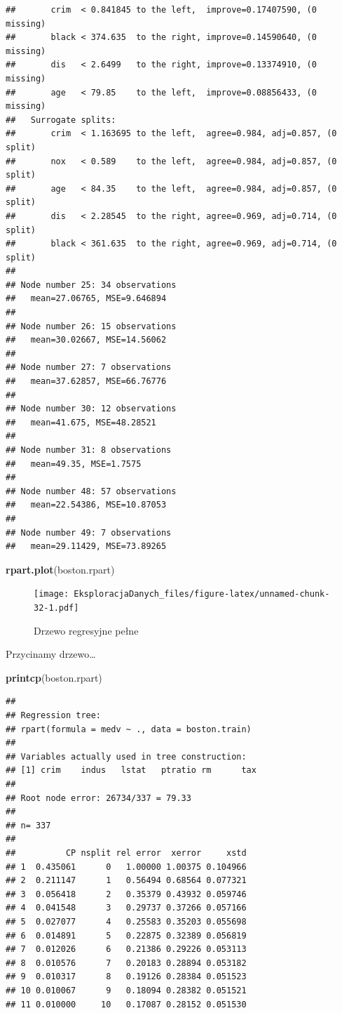 \documentclass[]{book}
\newenvironment{Shaded}{\begin{snugshade}}{\end{snugshade}}
\newcommand{\KeywordTok}[1]{\textcolor[rgb]{0.13,0.29,0.53}{\textbf{#1}}}
\newcommand{\NormalTok}[1]{#1}
\theoremstyle{plain}
\theoremstyle{definition}
\begin{document}
\begin{verbatim}
##       crim  < 0.841845 to the left,  improve=0.17407590, (0 missing)
##       black < 374.635  to the right, improve=0.14590640, (0 missing)
##       dis   < 2.6499   to the right, improve=0.13374910, (0 missing)
##       age   < 79.85    to the left,  improve=0.08856433, (0 missing)
##   Surrogate splits:
##       crim  < 1.163695 to the left,  agree=0.984, adj=0.857, (0 split)
##       nox   < 0.589    to the left,  agree=0.984, adj=0.857, (0 split)
##       age   < 84.35    to the left,  agree=0.984, adj=0.857, (0 split)
##       dis   < 2.28545  to the right, agree=0.969, adj=0.714, (0 split)
##       black < 361.635  to the right, agree=0.969, adj=0.714, (0 split)
## 
## Node number 25: 34 observations
##   mean=27.06765, MSE=9.646894 
## 
## Node number 26: 15 observations
##   mean=30.02667, MSE=14.56062 
## 
## Node number 27: 7 observations
##   mean=37.62857, MSE=66.76776 
## 
## Node number 30: 12 observations
##   mean=41.675, MSE=48.28521 
## 
## Node number 31: 8 observations
##   mean=49.35, MSE=1.7575 
## 
## Node number 48: 57 observations
##   mean=22.54386, MSE=10.87053 
## 
## Node number 49: 7 observations
##   mean=29.11429, MSE=73.89265
\end{verbatim}

\begin{Shaded}
\begin{Highlighting}[]
\KeywordTok{rpart.plot}\NormalTok{(boston.rpart)}
\end{Highlighting}
\end{Shaded}

\begin{figure}
\centering
\texttt{[image: EksploracjaDanych\_files/figure-latex/unnamed-chunk-32-1.pdf]}
\caption{\label{fig:unnamed-chunk-32}Drzewo regresyjne pełne}
\end{figure}

Przycinamy drzewo\ldots{}

\begin{Shaded}
\begin{Highlighting}[]
\KeywordTok{printcp}\NormalTok{(boston.rpart)}
\end{Highlighting}
\end{Shaded}

\begin{verbatim}
## 
## Regression tree:
## rpart(formula = medv ~ ., data = boston.train)
## 
## Variables actually used in tree construction:
## [1] crim    indus   lstat   ptratio rm      tax    
## 
## Root node error: 26734/337 = 79.33
## 
## n= 337 
## 
##          CP nsplit rel error  xerror     xstd
## 1  0.435061      0   1.00000 1.00375 0.104966
## 2  0.211147      1   0.56494 0.68564 0.077321
## 3  0.056418      2   0.35379 0.43932 0.059746
## 4  0.041548      3   0.29737 0.37266 0.057166
## 5  0.027077      4   0.25583 0.35203 0.055698
## 6  0.014891      5   0.22875 0.32389 0.056819
## 7  0.012026      6   0.21386 0.29226 0.053113
## 8  0.010576      7   0.20183 0.28894 0.053182
## 9  0.010317      8   0.19126 0.28384 0.051523
## 10 0.010067      9   0.18094 0.28382 0.051521
## 11 0.010000     10   0.17087 0.28152 0.051530
\end{verbatim}
\end{document}
